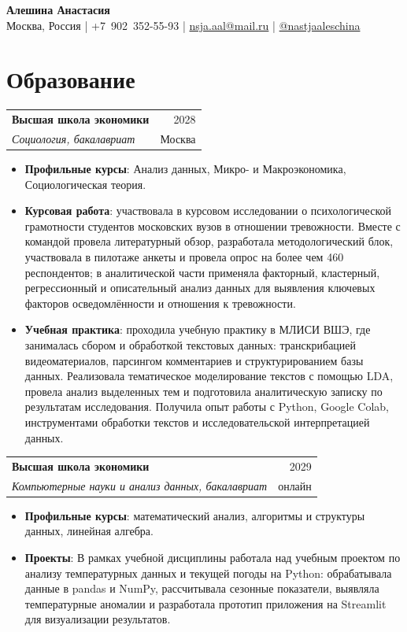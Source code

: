 \documentclass[a4paper, 12pt]{article}
\newcommand{\resumeSubheading}[4]{
  \vspace{3pt}
  \begin{tabularx}{\textwidth}{X r}
    \textbf{#1} & {\small\color{sub-grey} #2} \\
    \textit{\small #3} & {\small\color{sub-grey} #4} \\
  \end{tabularx}
  \vspace{1pt}
}
\newcommand{\resumeItemListStart}{\begin{itemize}[leftmargin=5.5mm, itemsep=3pt, topsep=4pt, parsep=0pt, label=\textcolor{accent-light}{\small\textbullet}]}
\newcommand{\resumeItemListEnd}{\end{itemize}\vspace{2pt}}
\newcommand{\resumeItem}[1]{\item \small #1}
\begin{document}
\begin{center}
  {\headingfont\fontsize{28}{30}\selectfont\bfseries\color{accent} Алешина Анастасия}\\[6pt]
  \small\color{sub-grey}
  Москва, Россия
  \quad\textcolor{line-grey}{|}\quad
  +7~902~352-55-93
  \quad\textcolor{line-grey}{|}\quad
  \href{mailto:nsja.aal@mail.ru}{nsja.aal@mail.ru}
  \quad\textcolor{line-grey}{|}\quad
  \href{https://t.me/nastjaaleschina}{@nastjaaleschina}
\end{center}

\section{Образование}

\resumeSubheading
  {Высшая школа экономики}{2028}
  {Социология, бакалавриат}{Москва}
\resumeItemListStart
  \resumeItem{\textbf{Профильные курсы}: Анализ данных, Микро- и Макроэкономика, Социологическая теория.}
  \resumeItem{\textbf{Курсовая работа}: участвовала в курсовом исследовании о психологической грамотности студентов московских вузов в отношении тревожности. Вместе с командой провела литературный обзор, разработала методологический блок, участвовала в пилотаже анкеты и провела опрос на более чем 460 респондентов; в аналитической части применяла факторный, кластерный, регрессионный и описательный анализ данных для выявления ключевых факторов осведомлённости и отношения к тревожности.}
  \resumeItem{\textbf{Учебная практика}: проходила учебную практику в МЛИСИ ВШЭ, где занималась сбором и обработкой текстовых данных: транскрибацией видеоматериалов, парсингом комментариев и структурированием базы данных. Реализовала тематическое моделирование текстов с помощью LDA, провела анализ выделенных тем и подготовила аналитическую записку по результатам исследования. Получила опыт работы с Python, Google Colab, инструментами обработки текстов и исследовательской интерпретацией данных.}
\resumeItemListEnd

\resumeSubheading
  {Высшая школа экономики}{2029}
  {Компьютерные науки и анализ данных, бакалавриат}{онлайн}
\resumeItemListStart
  \resumeItem{\textbf{Профильные курсы}: математический анализ, алгоритмы и структуры данных, линейная алгебра.}
  \resumeItem{\textbf{Проекты}: В рамках учебной дисциплины работала над учебным проектом по анализу температурных данных и текущей погоды на Python: обрабатывала данные в pandas и NumPy, рассчитывала сезонные показатели, выявляла температурные аномалии и разработала прототип приложения на Streamlit для визуализации результатов.}
\resumeItemListEnd
\end{document}
